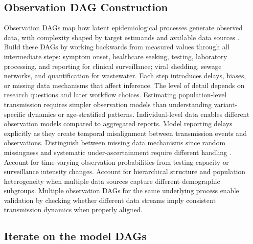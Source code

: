 \documentclass{article}
\begin{document}
\subsection{Observation DAG Construction}

Observation DAGs map how latent epidemiological processes generate observed data, with complexity shaped by target estimands and available data sources \citep{deangelis2018analysing}.
Build these DAGs by working backwards from measured values through all intermediate steps: symptom onset, healthcare seeking, testing, laboratory processing, and reporting for clinical surveillance; viral shedding, sewage networks, and quantification for wastewater.
Each step introduces delays, biases, or missing data mechanisms that affect inference.
The level of detail depends on research questions and later workflow choices.
Estimating population-level transmission requires simpler observation models than understanding variant-specific dynamics or age-stratified patterns.
Individual-level data enables different observation models compared to aggregated reports.
Model reporting delays explicitly as they create temporal misalignment between transmission events and observations.
Distinguish between missing data mechanisms since random missingness and systematic under-ascertainment require different handling \citep{sherratt2021exploring}.
Account for time-varying observation probabilities from testing capacity or surveillance intensity changes.
Account for hierarchical structure and population heterogeneity when multiple data sources capture different demographic subgroups.
Multiple observation DAGs for the same underlying process enable validation by checking whether different data streams imply consistent transmission dynamics when properly aligned.

\subsection{Iterate on the model DAGs}
\end{document}
